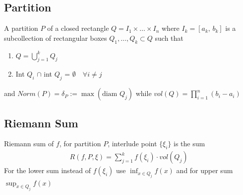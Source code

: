 \documentclass[8pt]{extarticle}
\begin{document}
\begin{multicols*}{3}
  \subsection{Partition}
  A partition $P$ of a closed rectangle $Q = I_1 \times \dots \times I_n$
  where $I_k = [a_k,\, b_k]$ is a subcollection of rectangular boxes
  $Q_1, \dots, Q_k \subset Q$ such that
  \begin{enumerate}[label=(\arabic*)]
    \item $Q = \bigcup_{j = 1}^k Q_j$
    \item Int $Q_i$ $\cap$ int $Q_j$ = $\emptyset \quad \forall i \neq j$
  \end{enumerate}
  and $Norm(P) = \delta_P := \max(\text{diam } Q_j)$ while
  $vol(Q) = \prod_{i = 1}^n (b_i - a_i)$
  \subsection{Riemann Sum}
  Riemann sum of $f$, for partition $P$, interlude point $\{\xi_i\}$
  is the sum
  \begin{align*}
    R(f, P, \xi) = \sum_{j = 1}^k f(\xi_i) \cdot vol(Q_j)
  \end{align*}
  For the lower sum instead of $f(\xi_i)$ use $\inf_{x \in Q_j} f(x)$
  and for upper sum $\sup_{x \in Q_j} f(x)$\\ \\

\end{multicols*}
\end{document}
